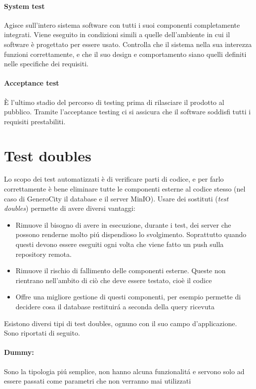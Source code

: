 \documentclass[italian, oneside]{sapthesis} %
\begin{document}
		\paragraph*{System test} Agisce sull'intero sistema software con tutti i suoi componenti completamente integrati. Viene eseguito in condizioni simili a quelle dell'ambiente in cui il software \`e progettato per essere usato. Controlla che il sistema nella sua interezza funzioni correttamente, e che il suo design e comportamento siano quelli definiti nelle specifiche dei requisiti.

		\paragraph*{Acceptance test} \`E l'ultimo stadio del percorso di testing prima di rilasciare il prodotto al pubblico. Tramite l'acceptance testing ci si assicura che il software soddisfi tutti i requisiti prestabiliti.

	\section{Test doubles}
		Lo scopo dei test automatizzati \`e di verificare parti di codice, e per farlo correttamente \`e bene eliminare tutte le componenti esterne al codice stesso (nel caso di GeneroCity il database e il server MinIO). Usare dei sostituti (\textit{test doubles}) permette di avere diversi vantaggi:
		\begin{itemize}
			\item Rimuove il bisogno di avere in esecuzione, durante i test, dei server che possono renderne molto pi\'u dispendioso lo svolgimento. Soprattutto quando questi devono essere eseguiti ogni volta che viene fatto un push sulla repository remota.
			\item Rimuove il rischio di fallimento delle componenti esterne. Queste non rientrano nell'ambito di ci\`o che deve essere testato, cio\`e il codice
			\item Offre una migliore gestione di questi componenti, per esempio permette di decidere cosa il database restituir\'a a seconda della query ricevuta
		\end{itemize}

		\pagebreak
		Esistono diversi tipi di test doubles, ognuno con il suo campo d'applicazione. Sono riportati di seguito.
		\paragraph*{Dummy:}
		Sono la tipologia pi\'u semplice, non hanno alcuna funzionalit\'a e servono solo ad essere passati come parametri che non verranno mai utilizzati
\end{document}
